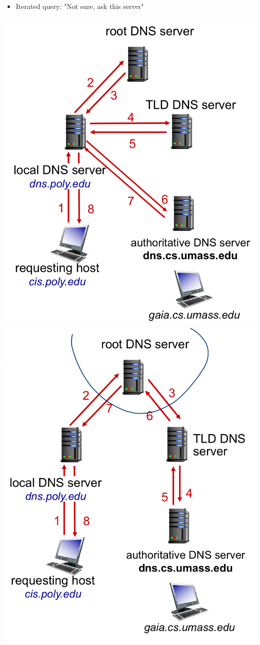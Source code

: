 \documentclass{article}
\begin{document}
\begin{multicols*}{3}
\begin{itemize}
	\item Iterated query: "Not sure, ask this server"    
\end{itemize}
\includegraphics[scale=0.08]{dns-iterative-query}
\includegraphics[scale=0.1]{dns-recursive-query}

\end{multicols*}
\end{document}
